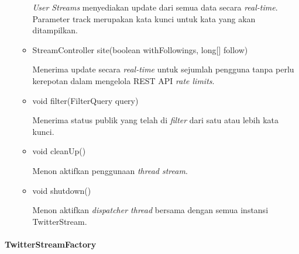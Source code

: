 \begin{itemize}
\begin{itemize}
			\textit{User Streams} menyediakan update dari semua data secara \textit{real-time}. Parameter track merupakan kata kunci untuk kata yang akan ditampilkan.
			\item StreamController site(boolean withFollowings, long[] follow)
			
			Menerima update secara \textit{real-time} untuk sejumlah pengguna tanpa perlu kerepotan dalam mengelola REST API \textit{rate limits}.
			\item void filter(FilterQuery query)
			
			Menerima status publik yang telah di \textit{filter} dari satu atau lebih kata kunci.
			\item void cleanUp()
			
			Menon aktifkan penggunaan \textit{thread stream}.
			\item void shutdown()
			
			Menon aktifkan \textit{dispatcher thread} bersama dengan semua instansi TwitterStream.
		\end{itemize}
	\end{itemize}
	\paragraph{TwitterStreamFactory}
	
